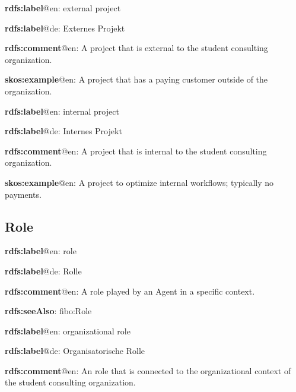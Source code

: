 \documentclass[a4paper, DIV=13, BCOR=0cm]{scrbook}
\begin{document}
\begin{mdframed}[style=onto-1, frametitle={External\_Project}]
	{%
		\begin{compactitem}
			\item \textbf{rdfs:label}@en: external project
			\item \textbf{rdfs:label}@de: Externes Projekt
			\item \textbf{rdfs:comment}@en: A project that is external to the student consulting organization.
			\item \textbf{skos:example}@en: A project that has a paying customer outside of the organization.
		\end{compactitem}
	} %
\end{mdframed}

\begin{mdframed}[style=onto-1, frametitle={Internal\_Project}]
	{%
		\begin{compactitem}
			\item \textbf{rdfs:label}@en: internal project
			\item \textbf{rdfs:label}@de: Internes Projekt
			\item \textbf{rdfs:comment}@en: A project that is internal to the student consulting organization.
			\item \textbf{skos:example}@en: A project to optimize internal workflows; typically no payments.
		\end{compactitem}
	} %
\end{mdframed}

\subsection{Role}

\begin{mdframed}[style=onto, frametitle={Role}]
	{%
		\begin{compactitem}
			\item \textbf{rdfs:label}@en: role
			\item \textbf{rdfs:label}@de: Rolle
			\item \textbf{rdfs:comment}@en: A role played by an Agent in a specific context.
			\item \textbf{rdfs:seeAlso}: fibo:Role
		\end{compactitem}
	} %
\end{mdframed}

\begin{mdframed}[style=onto-1, frametitle={Organizational\_Role}]
	{%
		\begin{compactitem}
			\item \textbf{rdfs:label}@en: organizational role
			\item \textbf{rdfs:label}@de: Organisatorische Rolle
			\item \textbf{rdfs:comment}@en: An role that is connected to the organizational context of the student consulting organization.
		\end{compactitem}
	} %
\end{mdframed}
\end{document}
